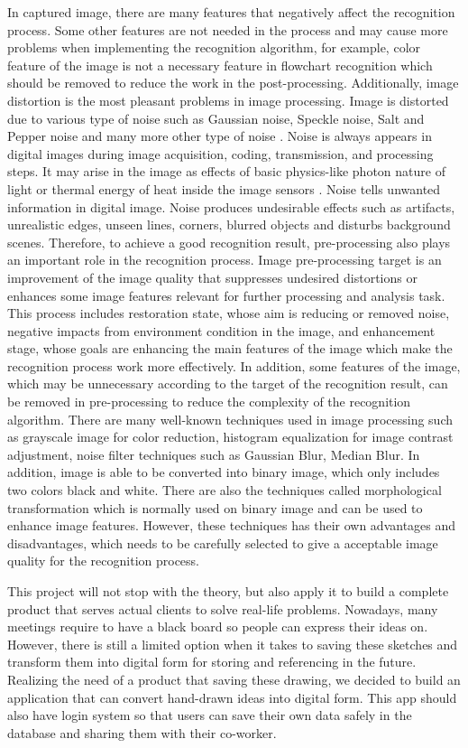 In captured image, there are many features that negatively affect the recognition process. Some other features are not needed in the process and may cause more problems when implementing the recognition algorithm, for example, color feature of the image is not a necessary feature in flowchart recognition which should be removed to reduce the work in the post-processing. Additionally, image distortion is the most pleasant problems in image processing. Image is distorted due to various type of noise such as Gaussian noise, Speckle noise, Salt and Pepper noise and many more other type of noise \cite{11}. Noise is always appears in digital images during image acquisition, coding, transmission, and processing steps. It may arise in the image as effects of basic physics-like photon nature of light or thermal energy of heat inside the image sensors \cite{10}. Noise tells unwanted information in digital image. Noise produces undesirable effects such as artifacts, unrealistic edges, unseen lines, corners, blurred objects and disturbs background scenes. Therefore, to achieve a good recognition result, pre-processing also plays an important role in the recognition process. Image pre-processing target is an improvement of the image quality that suppresses undesired distortions or enhances some image features relevant for further processing and analysis task. This process includes restoration state, whose aim is reducing or removed noise, negative impacts from environment condition in the image, and enhancement stage, whose goals are enhancing the main features of the image which make the recognition process work more effectively. In addition, some features of the image, which may be unnecessary according to the target of the recognition result, can be removed in pre-processing to reduce the complexity of the recognition algorithm. There are many well-known techniques used in image processing such as grayscale image for color reduction, histogram equalization for image contrast adjustment, noise filter techniques such as Gaussian Blur, Median Blur. In addition, image is able to be converted into binary image, which only includes two colors black and white. There are also the techniques called morphological transformation which is normally used on binary image and can be used to enhance image features. However, these techniques has their own advantages and disadvantages, which needs to be carefully selected to give a acceptable image quality for the recognition process.

This project will not stop with the theory, but also apply it to build a complete product that serves actual clients to solve real-life problems. Nowadays, many meetings require to have a black board so people can express their ideas on. However, there is still a limited option when it takes to saving these sketches and transform them into digital form for storing and referencing in the future. Realizing the need of a product that saving these drawing, we decided to build an application that can convert hand-drawn ideas into digital form. This app should also have login system so that users can save their own data safely in the database and sharing them with their co-worker.

